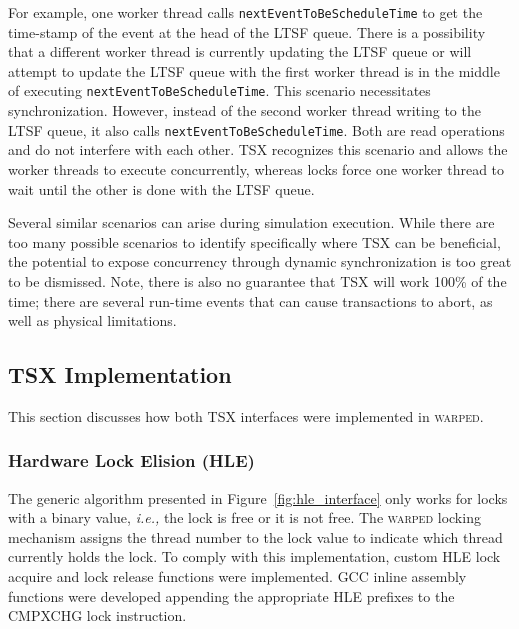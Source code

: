 \documentclass{sig-alternate}
\begin{document}
For example, one worker thread calls \texttt{nextEventToBeScheduleTime} to get the
time-stamp of the event at the head of the LTSF queue.  There is a possibility that a
different worker thread is currently updating the LTSF queue or will attempt to update the
LTSF queue with the first worker thread is in the middle of executing
\texttt{nextEventToBeScheduleTime}.  This scenario necessitates synchronization.  However,
instead of the second worker thread writing to the LTSF queue, it also calls
\texttt{nextEventToBeScheduleTime}.  Both are read operations and do not interfere with
each other.  TSX recognizes this scenario and allows the worker threads to execute
concurrently, whereas locks force one worker thread to wait until the other is done with
the LTSF queue.

Several similar scenarios can arise during simulation execution.  While there are too many
possible scenarios to identify specifically where TSX can be beneficial, the potential to
expose concurrency through dynamic synchronization is too great to be dismissed.  Note,
there is also no guarantee that TSX will work 100\% of the time; there are several
run-time events that can cause transactions to abort, as well as physical limitations.

\subsection{TSX Implementation}

This section discusses how both TSX interfaces were implemented in \textsc{warped}.

\subsubsection{Hardware Lock Elision (HLE)}

The generic algorithm presented in Figure~\ref{fig:hle_interface} only works for locks
with a binary value, \emph{i.e.,} the lock is free or it is not free.  The \textsc{warped}
locking mechanism assigns the thread number to the lock value to indicate which thread
currently holds the lock.  To comply with this implementation, custom HLE lock acquire and
lock release functions were implemented.  GCC inline assembly functions were developed
appending the appropriate HLE prefixes to the CMPXCHG lock instruction.
\end{document}
